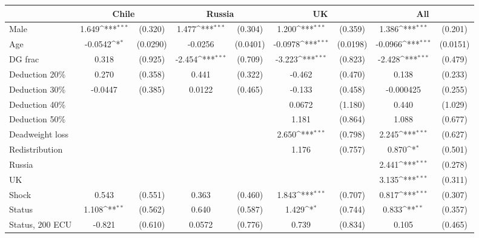 {
\def\sym#1{\ifmmode^{#1}\else\(^{#1}\)\fi}
\begin{tabular}{l*{4}{cc}}
\hline\hline
                &\multicolumn{2}{c}{Chile}   &\multicolumn{2}{c}{Russia}  &\multicolumn{2}{c}{UK}      &\multicolumn{2}{c}{All}     \\
\hline
Male            &    1.649\sym{***}&  (0.320)&    1.477\sym{***}&  (0.304)&    1.200\sym{***}&  (0.359)&    1.386\sym{***}&  (0.201)\\
Age             &  -0.0542\sym{*}  & (0.0290)&  -0.0256         & (0.0401)&  -0.0978\sym{***}& (0.0198)&  -0.0966\sym{***}& (0.0151)\\
DG frac         &    0.318         &  (0.925)&   -2.454\sym{***}&  (0.709)&   -3.223\sym{***}&  (0.823)&   -2.428\sym{***}&  (0.479)\\
Deduction 20\%  &    0.270         &  (0.358)&    0.441         &  (0.322)&   -0.462         &  (0.470)&    0.138         &  (0.233)\\
Deduction 30\%  &  -0.0447         &  (0.385)&   0.0122         &  (0.465)&   -0.133         &  (0.458)&-0.000425         &  (0.255)\\
Deduction 40\%  &                  &         &                  &         &   0.0672         &  (1.180)&    0.440         &  (1.029)\\
Deduction 50\%  &                  &         &                  &         &    1.181         &  (0.864)&    1.088         &  (0.677)\\
Deadweight loss &                  &         &                  &         &    2.650\sym{***}&  (0.798)&    2.245\sym{***}&  (0.627)\\
Redistribution  &                  &         &                  &         &    1.176         &  (0.757)&    0.870\sym{*}  &  (0.501)\\
Russia          &                  &         &                  &         &                  &         &    2.441\sym{***}&  (0.278)\\
UK              &                  &         &                  &         &                  &         &    3.135\sym{***}&  (0.311)\\
Shock           &    0.543         &  (0.551)&    0.363         &  (0.460)&    1.843\sym{***}&  (0.707)&    0.817\sym{***}&  (0.307)\\
Status          &    1.108\sym{**} &  (0.562)&    0.640         &  (0.587)&    1.429\sym{*}  &  (0.744)&    0.833\sym{**} &  (0.357)\\
Status, 200 ECU &   -0.821         &  (0.610)&   0.0572         &  (0.776)&    0.739         &  (0.834)&    0.105         &  (0.465)\\

\end{tabular}}
